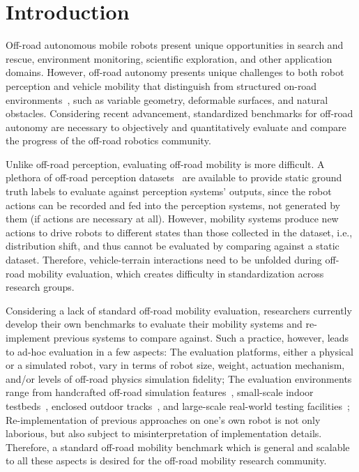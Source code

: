 \section{Introduction}
\label{sec::intro}

Off-road autonomous mobile robots present unique opportunities in search and rescue, environment monitoring, scientific exploration, and other application domains.  
However, off-road autonomy presents unique challenges to both robot perception and vehicle mobility that distinguish from structured on-road environments~\cite{jackel2006darpa, naranjo2016autonomous, price2024expanding}, such as variable geometry, deformable surfaces, and natural obstacles. Considering recent advancement, standardized benchmarks for off-road autonomy are necessary to objectively and quantitatively evaluate and compare the progress of the off-road robotics community. 

Unlike off-road perception, evaluating off-road mobility is more difficult. A plethora of off-road perception datasets~\cite{wigness2019rugd, jiang2021rellis, triest2022tartandrive, min2022orfd, mortimer2024goose, knights2023wild, sharma2022cat, liu2024botanicgarden} are available to provide static ground truth labels to evaluate against perception systems' outputs, since the robot actions can be recorded and fed into the perception systems, not generated by them  (if actions are necessary at all). However, mobility systems produce new actions to drive robots to different states than those collected in the dataset, i.e., distribution shift, and thus cannot be evaluated by comparing against a static dataset. Therefore, vehicle-terrain interactions need to be unfolded during off-road mobility evaluation, which creates difficulty in standardization across research groups. 

Considering a lack of standard off-road mobility evaluation, researchers currently develop their own benchmarks to evaluate their mobility systems and re-implement previous systems to compare against. Such a practice, however, leads to ad-hoc evaluation in a few aspects: The evaluation platforms, either a physical or a simulated robot, vary in terms of robot size, weight, actuation mechanism, and/or levels of off-road physics simulation fidelity; The evaluation environments range from handcrafted off-road simulation features~\cite{rana2024towards, yu2024adaptive, young2020unreal, xu2024reinforcement, cai2025pietra, so2022sim}, small-scale indoor testbeds~\cite{xu2023efficient, datar2024toward, xiao2018review, xiao2015locomotive}, enclosed outdoor tracks~\cite{goldfain2019autorally, xiao2021learning, atreya2022high, karnan2022vi, pan2020imitation}, and large-scale real-world testing facilities~\cite{triest2022tartandrive, han2023model, jiang2021rellis}; Re-implementation of previous approaches on one's own robot is not only laborious, but also subject to misinterpretation of implementation details. Therefore, a standard off-road mobility benchmark which is general and scalable to all these aspects is desired for the off-road mobility research community. 

